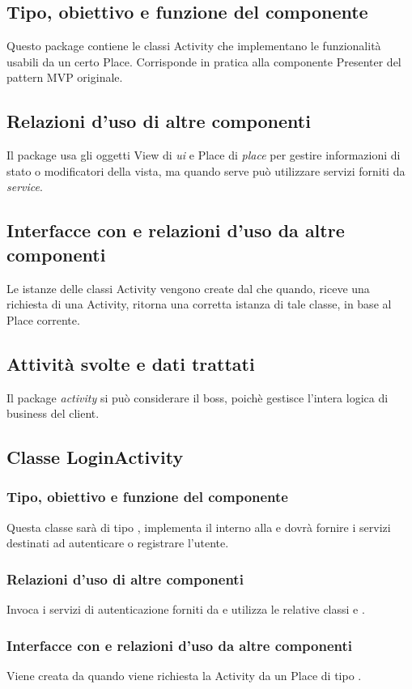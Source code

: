 \subsection*{Tipo, obiettivo e funzione del componente}
Questo package contiene le classi Activity che implementano le funzionalit\`a
usabili da un certo Place. Corrisponde in pratica alla componente Presenter del
pattern MVP originale.
\subsection*{Relazioni d'uso di altre componenti}
Il package usa gli oggetti View di \emph{ui} e Place di \emph{place} per gestire
informazioni di stato o modificatori della vista, ma quando serve pu\`o
utilizzare servizi forniti da \emph{service}.
\subsection*{Interfacce con e relazioni d'uso da altre componenti} Le istanze delle classi Activity vengono create dal 
che quando, riceve una richiesta di una Activity, ritorna una corretta istanza
di tale classe, in base al Place corrente.
\subsection*{Attivit\`a svolte e dati trattati}
Il package \emph{activity} si pu\`o considerare il boss, poich\`e gestisce
l'intera logica di business del client.

\subsection{Classe LoginActivity}
\subsubsection*{Tipo, obiettivo e funzione del componente}
Questa classe sar\`a di tipo , implementa il 
interno alla  e dovr\`a fornire i servizi destinati ad autenticare
o registrare l'utente.
\subsubsection*{Relazioni d'uso di altre componenti}
Invoca i servizi di autenticazione forniti da  e utilizza
le relative classi  e .
\subsubsection*{Interfacce con e relazioni d'uso da altre componenti} 
Viene creata da  quando viene richiesta la Activity da
un Place di tipo .
